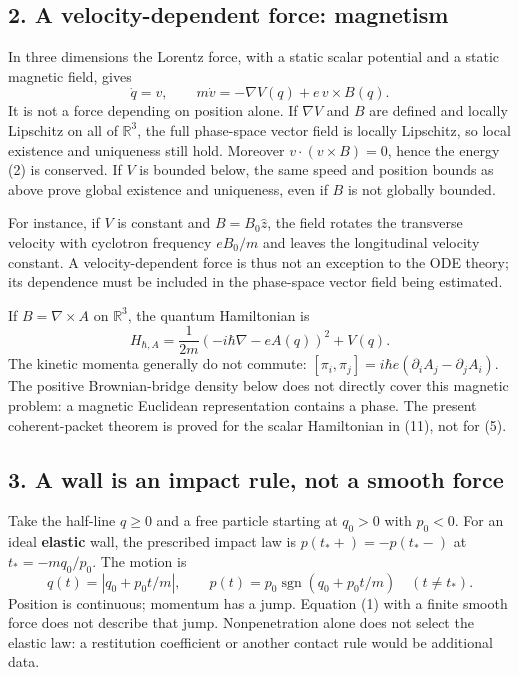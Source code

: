 \documentclass[11pt,a4paper]{article}
\begin{document}
\hypertarget{a-velocity-dependent-force-magnetism}{%
\subsection{2. A velocity-dependent force:
magnetism}\label{a-velocity-dependent-force-magnetism}}

In three dimensions the Lorentz force, with a static scalar potential
and a static magnetic field, gives \[
 \dot q=v,\qquad m\dot v=-\nabla V(q)+e\,v\times B(q). \tag{4}
\] It is not a force depending on position alone. If \(\nabla V\) and
\(B\) are defined and locally Lipschitz on all of \(\mathbb R^3\), the
full phase-space vector field is locally Lipschitz, so local existence
and uniqueness still hold. Moreover \(v\cdot(v\times B)=0\), hence the
energy (2) is conserved. If \(V\) is bounded below, the same speed and
position bounds as above prove global existence and uniqueness, even if
\(B\) is not globally bounded.

For instance, if \(V\) is constant and \(B=B_0\hat z\), the field
rotates the transverse velocity with cyclotron frequency \(eB_0/m\) and
leaves the longitudinal velocity constant. A velocity-dependent force is
thus not an exception to the ODE theory; its dependence must be included
in the phase-space vector field being estimated.

If \(B=\nabla\times A\) on \(\mathbb R^3\), the quantum Hamiltonian is
\[H_{\hbar,A}=\frac1{2m}(-i\hbar\nabla-eA(q))^2+V(q).\tag{5}\] The
kinetic momenta generally do not commute:
\([\pi_i,\pi_j]=i\hbar e(\partial_iA_j-\partial_jA_i)\). The positive
Brownian-bridge density below does not directly cover this magnetic
problem: a magnetic Euclidean representation contains a phase. The
present coherent-packet theorem is proved for the scalar Hamiltonian in
(11), not for (5).

\hypertarget{a-wall-is-an-impact-rule-not-a-smooth-force}{%
\subsection{3. A wall is an impact rule, not a smooth
force}\label{a-wall-is-an-impact-rule-not-a-smooth-force}}

Take the half-line \(q\ge0\) and a free particle starting at \(q_0>0\)
with \(p_0<0\). For an ideal \textbf{elastic} wall, the prescribed
impact law is \(p(t_*+)=-p(t_* -)\) at \(t_*=-mq_0/p_0\). The motion is
\[q(t)=|q_0+p_0t/m|,\qquad
 p(t)=p_0\operatorname{sgn}(q_0+p_0t/m)\quad(t\ne t_*).\tag{6}\]
Position is continuous; momentum has a jump. Equation (1) with a finite
smooth force does not describe that jump. Nonpenetration alone does not
select the elastic law: a restitution coefficient or another contact
rule would be additional data.
\end{document}
